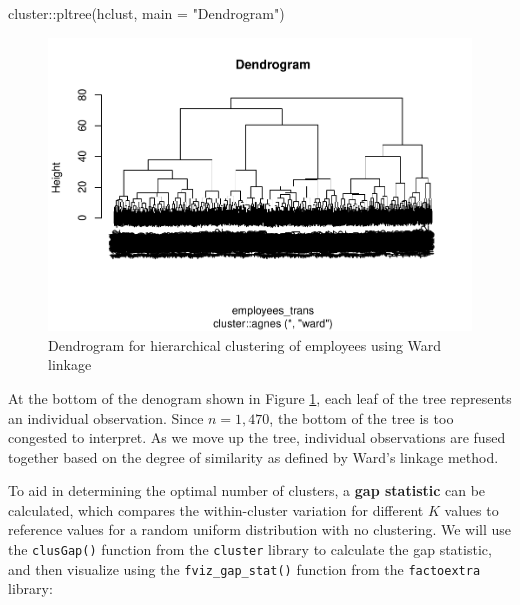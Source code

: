 \documentclass[
]{book}
\newenvironment{Shaded}{\begin{snugshade}}{\end{snugshade}}
\newcommand{\AttributeTok}[1]{\textcolor[rgb]{0.77,0.63,0.00}{#1}}
\newcommand{\FunctionTok}[1]{\textcolor[rgb]{0.00,0.00,0.00}{#1}}
\newcommand{\NormalTok}[1]{#1}
\newcommand{\SpecialCharTok}[1]{\textcolor[rgb]{0.00,0.00,0.00}{#1}}
\newcommand{\StringTok}[1]{\textcolor[rgb]{0.31,0.60,0.02}{#1}}
\begin{document}
\begin{Shaded}
\begin{Highlighting}[]
\NormalTok{cluster}\SpecialCharTok{::}\FunctionTok{pltree}\NormalTok{(hclust, }\AttributeTok{main =} \StringTok{"Dendrogram"}\NormalTok{)}
\end{Highlighting}
\end{Shaded}

\begin{figure}

{\centering \includegraphics[width=1\linewidth]{The_Fundamentals_of_People_Analytics_files/figure-latex/hclust-dendrogram-1} 

}

\caption{Dendrogram for hierarchical clustering of employees using Ward linkage}\label{fig:hclust-dendrogram}
\end{figure}

At the bottom of the denogram shown in Figure \ref{fig:hclust-dendrogram}, each leaf of the tree represents an individual observation. Since \(n = 1,470\), the bottom of the tree is too congested to interpret. As we move up the tree, individual observations are fused together based on the degree of similarity as defined by Ward's linkage method.

To aid in determining the optimal number of clusters, a \textbf{gap statistic} can be calculated, which compares the within-cluster variation for different \(K\) values to reference values for a random uniform distribution with no clustering. We will use the \texttt{clusGap()} function from the \texttt{cluster} library to calculate the gap statistic, and then visualize using the \texttt{fviz\_gap\_stat()} function from the \texttt{factoextra} library:
\end{document}
